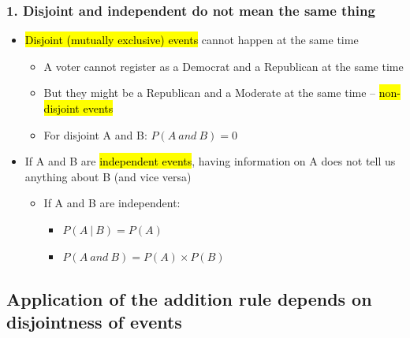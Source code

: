 \documentclass[slidestop,compress,mathserif,11pt,t,professionalfonts,xcolor=table]{beamer}
\begin{document}
\begin{frame}
\frametitle{1. Disjoint and independent do not mean the same thing}

\begin{itemize}

\item \hl{Disjoint (mutually exclusive) events} cannot happen at the same time
\begin{itemize} \pause
\item A voter cannot register as a Democrat and a Republican at the same time
\item But they might be a Republican and a Moderate at the same time -- 
\hl{non-disjoint events}
\item For disjoint A and B: $P(A~and~B) = 0$
\end{itemize}

\pause

\item If A and B are \hl{independent events}, having information on A does 
not tell us anything about B (and vice versa)
\begin{itemize}
\item If A and B are independent: 
\begin{itemize}
\item $P(A~|~B) = P(A)$
\item $P(A~and~B) = P(A) \times P(B)$
\end{itemize}
\end{itemize}

\end{itemize}
\end{frame}


\subsection{Application of the addition rule depends on disjointness of events}
\label{mi2}

\end{document}
